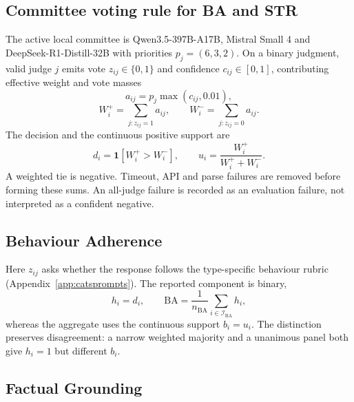 \subsection{Committee voting rule for BA and STR}

The active local committee is Qwen3.5-397B-A17B, Mistral Small 4 and
DeepSeek-R1-Distill-32B with priorities $p_j=(6,3,2)$. On a binary judgment,
valid judge $j$ emits vote $z_{ij}\in\{0,1\}$ and confidence $c_{ij}\in[0,1]$,
contributing effective weight and vote masses
\[
a_{ij}=p_j\max(c_{ij},0.01),
\]
\[
W_i^{+}=\!\!\sum_{j:z_{ij}=1}\!\!a_{ij},\qquad
W_i^{-}=\!\!\sum_{j:z_{ij}=0}\!\!a_{ij}.
\]
The decision and the continuous positive support are
\[
d_i=\mathbf{1}[W_i^{+}>W_i^{-}],\qquad
u_i=\frac{W_i^{+}}{W_i^{+}+W_i^{-}}.
\]
A weighted tie is negative. Timeout, API and parse failures are removed before
forming these sums. An all-judge failure is recorded as an evaluation failure,
not interpreted as a confident negative.

\subsection{Behaviour Adherence}

Here $z_{ij}$ asks whether the response follows the type-specific behaviour
rubric (Appendix~\ref{app:catsprompts}). The reported component is binary,
\[
h_i=d_i,\qquad
\mathrm{BA}=\frac{1}{n_{\mathrm{BA}}}\sum_{i\in\mathcal{I}_{\mathrm{BA}}}h_i,
\]
whereas the aggregate uses the continuous support $b_i=u_i$. The distinction
preserves disagreement: a narrow weighted majority and a unanimous panel both
give $h_i=1$ but different $b_i$.

\subsection{Factual Grounding}

